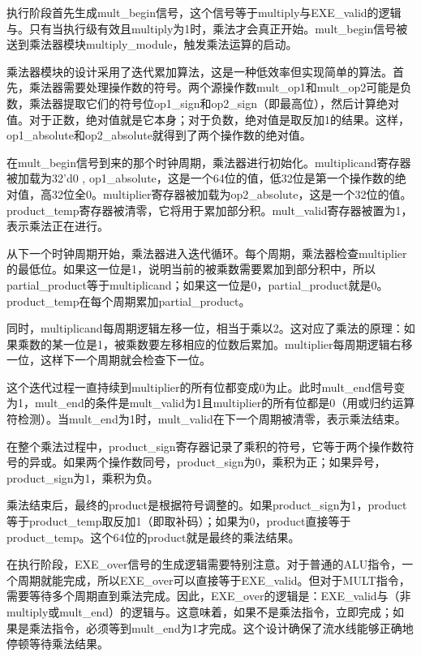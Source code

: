\documentclass[a4paper]{article}
\begin{document}
	执行阶段首先生成mult\_begin信号，这个信号等于multiply与EXE\_valid的逻辑与。只有当执行级有效且multiply为1时，乘法才会真正开始。mult\_begin信号被送到乘法器模块multiply\_module，触发乘法运算的启动。
	
	乘法器模块的设计采用了迭代累加算法，这是一种低效率但实现简单的算法。首先，乘法器需要处理操作数的符号。两个源操作数mult\_op1和mult\_op2可能是负数，乘法器提取它们的符号位op1\_sign和op2\_sign（即最高位），然后计算绝对值。对于正数，绝对值就是它本身；对于负数，绝对值是取反加1的结果。这样，op1\_absolute和op2\_absolute就得到了两个操作数的绝对值。
	
	在mult\_begin信号到来的那个时钟周期，乘法器进行初始化。multiplicand寄存器被加载为{32'd0 , op1\_absolute}，这是一个64位的值，低32位是第一个操作数的绝对值，高32位全0。multiplier寄存器被加载为op2\_absolute，这是一个32位的值。product\_temp寄存器被清零，它将用于累加部分积。mult\_valid寄存器被置为1，表示乘法正在进行。
	
	从下一个时钟周期开始，乘法器进入迭代循环。每个周期，乘法器检查multiplier的最低位。如果这一位是1，说明当前的被乘数需要累加到部分积中，所以partial\_product等于multiplicand；如果这一位是0，partial\_product就是0。product\_temp在每个周期累加partial\_product。
	
	同时，multiplicand每周期逻辑左移一位，相当于乘以2。这对应了乘法的原理：如果乘数的某一位是1，被乘数要左移相应的位数后累加。multiplier每周期逻辑右移一位，这样下一个周期就会检查下一位。
	
	这个迭代过程一直持续到multiplier的所有位都变成0为止。此时mult\_end信号变为1，mult\_end的条件是mult\_valid为1且multiplier的所有位都是0（用或归约运算符检测）。当mult\_end为1时，mult\_valid在下一个周期被清零，表示乘法结束。
	
	在整个乘法过程中，product\_sign寄存器记录了乘积的符号，它等于两个操作数符号的异或。如果两个操作数同号，product\_sign为0，乘积为正；如果异号，product\_sign为1，乘积为负。
	
	乘法结束后，最终的product是根据符号调整的。如果product\_sign为1，product等于product\_temp取反加1（即取补码）；如果为0，product直接等于product\_temp。这个64位的product就是最终的乘法结果。
	
	在执行阶段，EXE\_over信号的生成逻辑需要特别注意。对于普通的ALU指令，一个周期就能完成，所以EXE\_over可以直接等于EXE\_valid。但对于MULT指令，需要等待多个周期直到乘法完成。因此，EXE\_over的逻辑是：EXE\_valid与（非multiply或mult\_end）的逻辑与。这意味着，如果不是乘法指令，立即完成；如果是乘法指令，必须等到mult\_end为1才完成。这个设计确保了流水线能够正确地停顿等待乘法结果。
	
\end{document}
